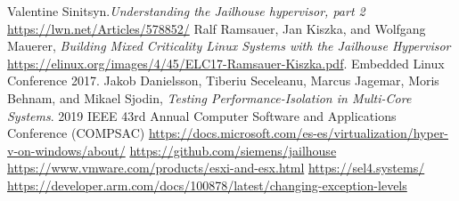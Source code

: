 \documentclass[spanish,12pt,a4paper,oneside]{book}
\begin{document}
\begin{thebibliography}{00}
   Valentine Sinitsyn.\emph{Understanding the Jailhouse hypervisor, part 2} \url{https://lwn.net/Articles/578852/}
   Ralf Ramsauer, Jan Kiszka, and Wolfgang Mauerer, \emph{Building Mixed Criticality Linux Systems with the Jailhouse Hypervisor} \url{https://elinux.org/images/4/45/ELC17-Ramsauer-Kiszka.pdf}. Embedded Linux Conference 2017.
   Jakob Danielsson, Tiberiu Seceleanu, Marcus Jagemar, Moris Behnam, and Mikael Sjodin, \emph{Testing Performance-Isolation in Multi-Core Systems}. 2019 IEEE 43rd Annual Computer Software and Applications Conference (COMPSAC)
	 \url{https://docs.microsoft.com/es-es/virtualization/hyper-v-on-windows/about/}
	 \url{https://github.com/siemens/jailhouse}
	 \url{https://www.vmware.com/products/esxi-and-esx.html}
	 \url{https://sel4.systems/}
	 \url{https://developer.arm.com/docs/100878/latest/changing-exception-levels}

\end{thebibliography}
\end{document}
